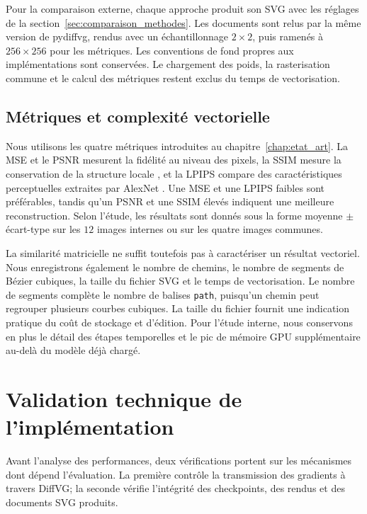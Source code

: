 \documentclass[12pt, a4paper, oneside]{report}
\begin{document}
Pour la comparaison externe, chaque approche produit son SVG avec les réglages de la section~\ref{sec:comparaison_methodes}. Les documents sont relus par la même version de pydiffvg, rendus avec un échantillonnage $2 \times 2$, puis ramenés à $256 \times 256$ pour les métriques. Les conventions de fond propres aux implémentations sont conservées. Le chargement des poids, la rasterisation commune et le calcul des métriques restent exclus du temps de vectorisation.

\subsection{Métriques et complexité vectorielle}

Nous utilisons les quatre métriques introduites au chapitre~\ref{chap:etat_art}. La MSE et le PSNR mesurent la fidélité au niveau des pixels, la SSIM mesure la conservation de la structure locale \cite{wang2004ssim}, et la LPIPS compare des caractéristiques perceptuelles extraites par AlexNet \cite{zhang2018lpips}. Une MSE et une LPIPS faibles sont préférables, tandis qu'un PSNR et une SSIM élevés indiquent une meilleure reconstruction. Selon l'étude, les résultats sont donnés sous la forme moyenne $\pm$ écart-type sur les $12$ images internes ou sur les quatre images communes.

La similarité matricielle ne suffit toutefois pas à caractériser un résultat vectoriel. Nous enregistrons également le nombre de chemins, le nombre de segments de Bézier cubiques, la taille du fichier SVG et le temps de vectorisation. Le nombre de segments complète le nombre de balises \texttt{path}, puisqu'un chemin peut regrouper plusieurs courbes cubiques. La taille du fichier fournit une indication pratique du coût de stockage et d'édition. Pour l'étude interne, nous conservons en plus le détail des étapes temporelles et le pic de mémoire GPU supplémentaire au-delà du modèle déjà chargé.

\section{Validation technique de l'implémentation}
\label{sec:validation_technique}

Avant l'analyse des performances, deux vérifications portent sur les mécanismes dont dépend l'évaluation. La première contrôle la transmission des gradients à travers DiffVG; la seconde vérifie l'intégrité des checkpoints, des rendus et des documents SVG produits.
\end{document}
